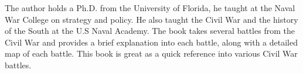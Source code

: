 The author holds a Ph.D. from the University of Florida, he taught at the Naval
War College on strategy and policy. He also taught the Civil War and the
history of the South at the U.S Naval Academy. The book takes several battles
from the Civil War and provides a brief explanation into each battle, along
with a detailed map of each battle. This book is great as a quick reference
into various Civil War battles.

